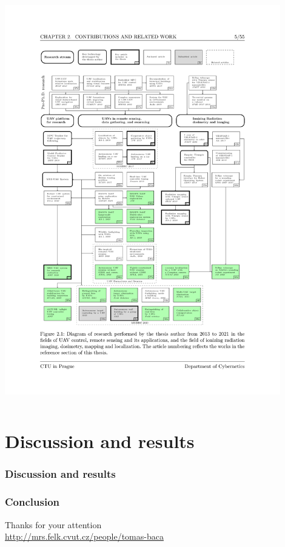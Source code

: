 \documentclass[aspectratio=169]{beamer}
\begin{document}
\begin{frame}
\begin{columns}[c]
\includegraphics[width=0.9\textwidth,trim={2.0cm 5.0cm 2.5cm 5.2cm},clip]{./fig/pubgraph.pdf}

\end{columns}

\end{frame}


\section{Discussion and results}


\begin{frame}
\frametitle{Discussion and results}

\end{frame}



\begin{frame}
  \frametitle{Conclusion}

  \begin{center}
    \huge Thanks for your attention\\
    \vspace{1em}
    \large \url{http://mrs.felk.cvut.cz/people/tomas-baca}
  \end{center}

\end{frame}
\end{document}
